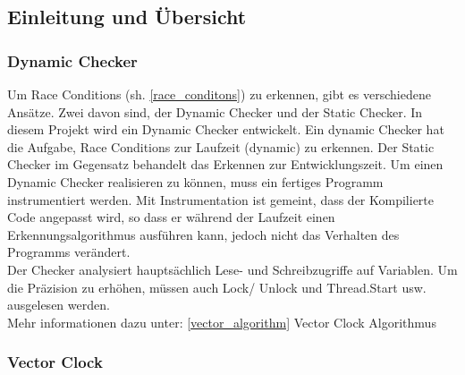 \documentclass[10pt,a4paper]{article}
\begin{document}
\subsection{Einleitung und Übersicht}
\subsubsection{Dynamic Checker}
\begin{flushleft}
Um Race Conditions (sh. \ref{race_conditons}) zu erkennen, gibt es verschiedene Ansätze. Zwei davon sind, der Dynamic Checker und der Static Checker. In diesem Projekt
wird ein Dynamic Checker entwickelt. Ein dynamic Checker hat die Aufgabe, Race Conditions zur Laufzeit (dynamic) zu erkennen. Der Static Checker
im Gegensatz behandelt das Erkennen zur Entwicklungszeit. Um einen Dynamic Checker realisieren zu können, muss ein fertiges Programm instrumentiert werden.
Mit Instrumentation ist gemeint, dass der Kompilierte Code angepasst wird, so dass er während der Laufzeit einen Erkennungsalgorithmus ausführen kann, jedoch nicht das Verhalten des Programms verändert.\\
Der Checker analysiert hauptsächlich Lese- und Schreibzugriffe auf Variablen. Um die Präzision zu erhöhen, müssen auch Lock/ Unlock und Thread.Start usw. ausgelesen werden.\\
Mehr informationen dazu unter: \ref{vector_algorithm} Vector Clock Algorithmus
\end{flushleft}
\subsubsection{Vector Clock}
\end{document}
